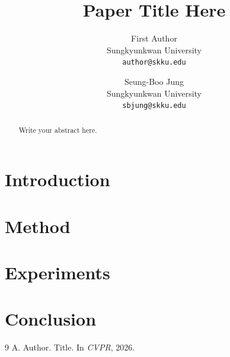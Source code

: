 \documentclass[10pt,twocolumn,letterpaper]{article}
\title{Paper Title Here}
\author{First Author\\
Sungkyunkwan University\\
{\tt\small author@skku.edu}
\and
Seung-Boo Jung\\
Sungkyunkwan University\\
{\tt\small sbjung@skku.edu}
}
\begin{document}
\maketitle

\begin{abstract}
Write your abstract here.
\end{abstract}

\section{Introduction}

\section{Method}

\section{Experiments}

\section{Conclusion}

\begin{thebibliography}{9}
 A. Author. Title. In \emph{CVPR}, 2026.
\end{thebibliography}
\end{document}
